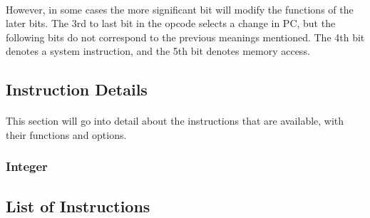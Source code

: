 \documentclass[letterpaper, 11pt]{article}
\begin{document}
\paragraph{} However, in some cases the more significant bit will modify the functions of the later bits. The 3rd to last
bit in the opcode selects a change in PC, but the following bits do not correspond to the previous meanings mentioned. The
4th bit denotes a system instruction, and the 5th bit denotes memory access. 
\newpage
\subsection{Instruction Details}
\paragraph{}This section will go into detail about the instructions that are available, with their functions and options.\\
\subsubsection{Integer}

\subsection{List of Instructions}
\end{document}
